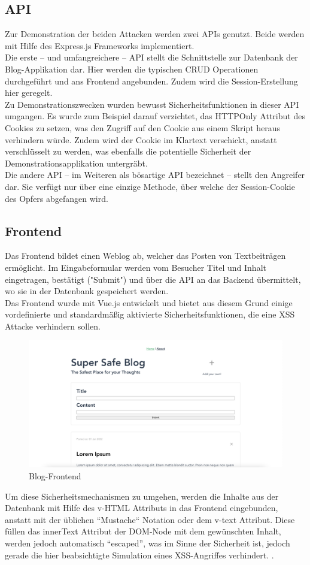 \subsection{API}
Zur Demonstration der beiden Attacken werden zwei APIs genutzt. Beide werden mit Hilfe des Express.js Frameworks implementiert. \\
Die erste – und umfangreichere – API stellt die Schnittstelle zur Datenbank der Blog-Applikation dar. Hier werden die typischen CRUD Operationen durchgeführt und ans Frontend angebunden. Zudem wird die Session-Erstellung hier geregelt.\\
Zu Demonstrationszwecken wurden bewusst Sicherheitsfunktionen in dieser API umgangen. Es wurde zum Beispiel darauf verzichtet, das HTTPOnly Attribut des Cookies zu setzen, was den Zugriff auf den Cookie aus einem Skript heraus verhindern würde. Zudem wird der Cookie im Klartext verschickt, anstatt verschlüsselt zu werden, was ebenfalls die potentielle Sicherheit der Demonstrationsapplikation untergräbt.\\
Die andere API – im Weiteren als bösartige API bezeichnet – stellt den Angreifer dar. Sie verfügt nur über eine einzige Methode, über welche der Session-Cookie des Opfers abgefangen wird. 
\subsection{Frontend}
Das Frontend bildet einen Weblog ab, welcher das Posten von Textbeiträgen ermöglicht. Im Eingabeformular werden vom Besucher Titel und Inhalt eingetragen, bestätigt ("Submit") und über die API an das Backend übermittelt, wo sie in der Datenbank gespeichert werden.\\
Das Frontend wurde mit Vue.js entwickelt und bietet aus diesem Grund einige vordefinierte und standardmäßig aktivierte Sicherheitsfunktionen, die eine \ac{XSS}
 Attacke verhindern sollen. 
\begin{figure}
    \includegraphics[width=\linewidth]{img/blog.png}
    \caption{Blog-Frontend}
    \label{fig:frontend}
\end{figure}
Um diese Sicherheitsmechanismen zu umgehen, werden die Inhalte aus der Datenbank mit Hilfe des v-HTML Attributs in das Frontend eingebunden, anstatt mit der üblichen ``Mustache`` Notation oder dem v-text Attribut. Diese füllen das innerText Attribut der DOM-Node mit dem gewünschten Inhalt, werden jedoch automatisch ``escaped'', was im Sinne der Sicherheit ist, jedoch gerade die hier beabsichtigte Simulation eines XSS-Angriffes verhindert. . 

